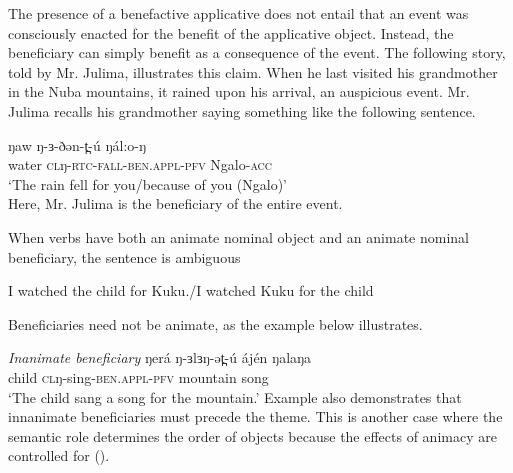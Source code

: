The presence of a benefactive applicative does not entail that an event was consciously enacted for the benefit of the applicative object. Instead, the beneficiary can simply benefit as a consequence of the event. The following story, told by Mr. Julima, illustrates this claim. When he last visited his grandmother in the Nuba mountains, it rained upon his arrival, an auspicious event. Mr. Julima recalls his grandmother saying something like the following sentence.

\ea \gll ŋaw ŋ-ɜ-ðən-t̪-ú ŋál:o-ŋ\\
water \textsc{cl}ŋ-\textsc{rtc}-\textsc{fall}-\textsc{ben.appl-pfv} Ngalo-\textsc{acc}\\
\glt `The rain fell for you/because of you (Ngalo)'\\
\z 
Here, Mr. Julima is the beneficiary of the entire event.

When verbs have both an animate nominal object and an animate nominal beneficiary, the sentence is ambiguous

\ea I watched the child for Kuku./I watched Kuku for the child
\z 

Beneficiaries need not be animate, as the example below illustrates.

\ea \textit{Inanimate beneficiary}  \label{ex:ch12:inanben}
\ea \gll ŋerá ŋ-ɜlɜŋ-ət̪-ú ájén ŋalaŋa\\
child \textsc{cl}ŋ-sing-\textsc{ben.appl-pfv} mountain song\\
\glt `The child sang a song for the mountain.'
\z 
\z 
Example  also demonstrates that innanimate beneficiaries must precede the theme. This is another case where the semantic role determines the order of objects because the effects of animacy are controlled for ().


%
%


